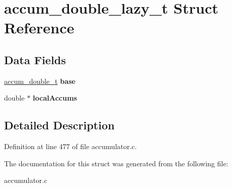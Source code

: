 \hypertarget{structaccum__double__lazy__t}{\section{accum\-\_\-double\-\_\-lazy\-\_\-t Struct Reference}
\label{structaccum__double__lazy__t}
}
\subsection*{Data Fields}
\begin{DoxyCompactItemize}
\item 
\hypertarget{structaccum__double__lazy__t_af4b818240e38563422022eaee06846e1}{\hyperlink{structaccum__double__t}{accum\-\_\-double\-\_\-t} {\bfseries base}}\label{structaccum__double__lazy__t_af4b818240e38563422022eaee06846e1}

\item 
\hypertarget{structaccum__double__lazy__t_add26fd5a0b87d3cb40211852b38d4a39}{double $\ast$ {\bfseries local\-Accums}}\label{structaccum__double__lazy__t_add26fd5a0b87d3cb40211852b38d4a39}

\end{DoxyCompactItemize}


\subsection{Detailed Description}


Definition at line 477 of file accumulator.\-c.



The documentation for this struct was generated from the following file\-:\begin{DoxyCompactItemize}
\item 
accumulator.\-c\end{DoxyCompactItemize}
